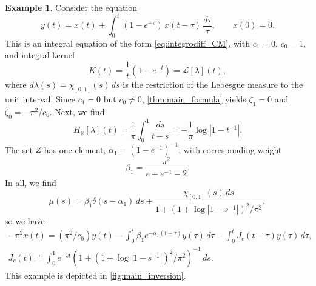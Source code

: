 \documentclass{cams-l} %
\newcommand{\dave}[1]{#1}\newcommand{\davebegin}{}\newcommand{\daveend}{}\newcommand{\george}[1]{#1}
\newcommand{\RR}{\mathbb R}
\newcommand{\cL}{\mathcal L}
\theoremstyle{definition}
\newtheorem{example}[theorem]{Example}
\theoremstyle{remark}
\numberwithin{equation}{section}
\begin{document}
\begin{example}\label{ex:gCM}
    \dave{Consider the equation
    \[y(t) = x(t) + \int_0^t (1-e^{-\tau})\,x(t-\tau)\,\frac{d\tau}{\tau},\qquad x(0) = 0.\]
    This is an integral equation of the form \ref{eq:integrodiff_CM}, with $c_1=0$, $c_0=1$, and integral kernel
    \[K(t) = \frac{1}{t}(1-e^{-t}) = \cL[\lambda](t),\]
    where $d\lambda(s) = \chi_{[0,1]}(s)\,ds$ is the restriction of the Lebesgue measure to the unit interval. Since $c_1=0$ but $c_0\neq 0$, \cref{thm:main_formula} yields $\zeta_1=0$ and $\zeta_0=-\pi^2/c_0$. Next, we find
    \[H_\RR[\lambda](t) = \frac{1}{\pi}\int_0^1\frac{ds}{t-s} = -\frac{1}{\pi}\log\left|1-t^{-1}\right|.\]
    The set $Z$ has one element, $\alpha_1=(1-e^{-1})^{-1}$, with corresponding weight
    \[\beta_1 = \frac{\pi^2}{e + e^{-1} - 2}.\]
    In all, we find
    \[\mu(s) = \beta_1\delta(s-\alpha_1)\,ds + \frac{\chi_{[0, 1]}(s)\,ds}{1 + (1 + \log|1-s^{-1}|)^2/\pi^2},\]
    so we have
    \begin{gather*}
        -\pi^2x(t) = (\pi^2/c_0)y(t) - \int_0^t \beta_1e^{-\alpha_1(t-\tau)}y(\tau)\,d\tau - \int_0^t J_c(t-\tau)y(\tau)\,d\tau,\\
        J_c(t) \doteq \int_0^1e^{-st}\left(1 + (1 + \log|1-s^{-1}|)^2/\pi^2\right)^{-1}\,ds.
    \end{gather*}
    This example is depicted in \cref{fig:main_inversion}.}
\end{example}
\end{document}
